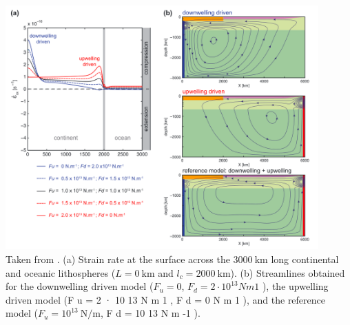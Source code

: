 \begin{center}
\includegraphics[width=12cm]{python_codes/fieldstone_143/images/yahb13_c}\\
{\captionfont Taken from \cite{yahb13}.
(a) Strain rate at the surface across the $3000~\si{\km}$ long continental and oceanic lithospheres
($L=0~\si{\km}$ and $l_ c=2000~\si{\km}$). 
(b) Streamlines obtained for the downwelling driven model
($F_u=0$, $F_d=2 \cdot 10^{13} N m 1$ ), 
the upwelling driven model (F u = 2 · 10 13 N m 1 , F d = 0 N m 1 ), and
the reference model ($F_u=10^{13}~\si{\newton\per\meter}$, F d = 10 13 N m -1 ).
}
\end{center}












































